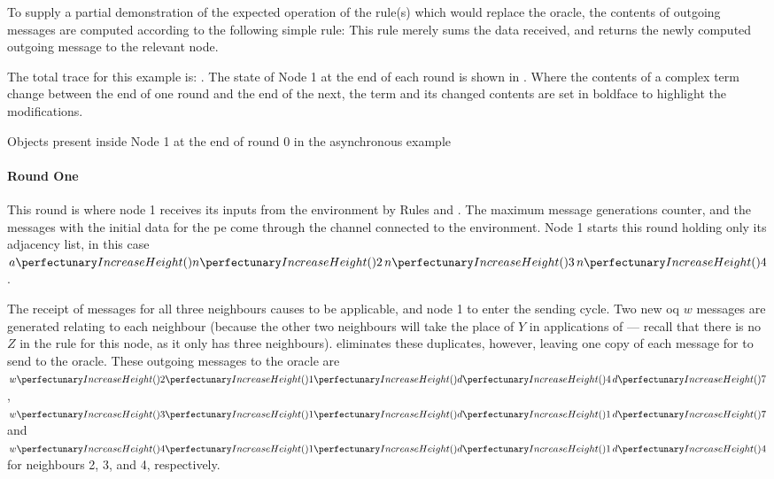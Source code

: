 To supply a partial demonstration of the expected operation of the rule(s) which would replace the oracle, the contents of outgoing messages are computed according to the following simple rule:   This rule merely sums the data received, and returns the newly computed outgoing message to the relevant node.

\setcounter{traces}{-1}

The total trace for this example is: \tracn{{\label{trace:0}}--}{--}{--} \tarr{}  \tarr{}  \tarr{}  \tarr{}  \tarr{}  \tarr{} \tracn{\label{trace:6}--}{--}{--}.  The state of Node 1 at the end of each round is shown in .  Where the contents of a complex term change between the end of one round and the end of the next, the term and its changed contents are set in boldface to highlight the modifications.

\begin{cpobjectsfloat}
\begin{cpobjects}
\end{cpobjects}
\caption{\label{objs:nmp:ex0}Objects present inside Node 1 at the end of round 0 in the asynchronous  example}
\end{cpobjectsfloat}

\paragraph{Round One}
This round is where node 1 receives its inputs from the environment by Rules  and .  The maximum message generations counter, and the messages with the initial data for the \gls{pe} come through the channel connected to the environment.  Node 1 starts this round holding only its adjacency list, in this case \(\cpfunc{a}{\cpfunc{n}{2} \, \cpfunc{n}{3} \, \cpfunc{n}{4}}\).

The receipt of messages for all three neighbours causes  to be applicable, and node 1 to enter the sending cycle.  Two new \gls{oq} \(w\) messages are generated relating to each neighbour (because the other two neighbours will take the place of \(Y\) in applications of  --- recall that there is no \(Z\) in the rule for this node, as it only has three neighbours).   eliminates these duplicates, however, leaving one copy of each message for  to send to the oracle.  These outgoing messages to the oracle are \(\cpvw{2}{1}{\cpfunc{d}{4} \, \cpfunc{d}{7}}\), \(\cpvw{3}{1}{\cpfunc{d}{1} \, \cpfunc{d}{7}}\) and \(\cpvw{4}{1}{\cpfunc{d}{1} \, \cpfunc{d}{4}}\) for neighbours 2, 3, and 4, respectively.

